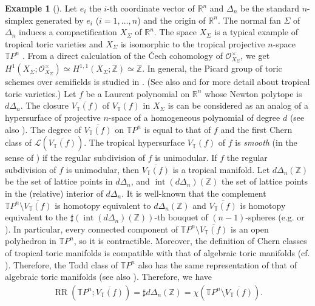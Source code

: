 \documentclass[a4paper,dvipdfmx,reqno,12pt]{amsart}
\theoremstyle{definition}
\newtheorem{example}[theorem]{Example}
\newcommand{\opn}[1]{\operatorname{#1}}
\numberwithin{equation}{section}
\begin{document}
\begin{example}[{\cite[Example 2.11]{demedrano2023chern}}]
\label{example-TPn}
Let $e_i$ the $i$-th coordinate vector of $\mathbb{R}^n$
and $\Delta_{n}$ be the standard $n$-simplex generated by
$e_i$ ($i=1,\ldots,n$) and the origin of $\mathbb{R}^n$.
The normal fan $\Sigma$ of $\Delta_{n}$ induces 
a compactification $X_{\Sigma}$ of $\mathbb{R}^n$.
The space $X_{\Sigma}$ is a typical example of
tropical toric varieties \cite{MR2428356,MR2511632}
and $X_{\Sigma}$ is
isomorphic to the tropical projective
$n$-space $\mathbb{T}P^{n}$ \cite[Example 3.10]{MR2275625}.
From a direct calculation of the \v{C}ech cohomology of
$\mathcal{O}_{X_{\Sigma}}^{\times}$, we get 
$H^{1}(X_{\Sigma};\mathcal{O}_{X_{\Sigma}}^{\times})
\simeq H^{1,1}(X_{\Sigma};\mathbb{Z})\simeq \mathbb{Z}$.
In general, the Picard group of toric 
schemes over semifields is studied in \cite{MR4016643}. 
(See also \cite{Meyer2011} and
\cite[Chapter 3]{mikhalkin2018tropical} for more detail
about tropical toric varieties.)
Let $f$ be a Laurent polynomial on $\mathbb{R}^{n}$
whose Newton polytope is $d\Delta_{n}$.
The closure $\overline{V_{\mathbb{T}}(f)}$ of 
$V_{\mathbb{T}}(f)$ in $X_{\Sigma}$
is can be considered
as an analog of a hypersurface of projective $n$-space of
a homogeneous polynomial of degree $d$
(see also \cite[Definition 3.4.6]{mikhalkin2018tropical}).
The degree of $\overline{V_{\mathbb{T}}(f)}$
on $\mathbb{T}P^n$ is equal to 
that of $f$ and the first Chern class 
of $\mathcal{L}(\overline{V_{\mathbb{T}}(f)})$.
The tropical hypersurface $V_{\mathbb{T}}(f)$ of $f$
is \emph{smooth} (in the sense of
\cite[]{MR3287221})
if the regular subdivision of $f$ is unimodular.
If $f$ the regular subdivision of $f$ is unimodular,
then $\overline{V_{\mathbb{T}}(f)}$ is a tropical manifold.
Let $d\Delta_n(\mathbb{Z})$ be the set of lattice points
in $d\Delta_n$, and 
$\opn{int}(d\Delta_n)(\mathbb{Z})$ the set of lattice points
in the (relative) interior of $d\Delta_n$.
It is well-known that the complement 
$\mathbb{T}P^{n}\setminus
\overline{V_{\mathbb{T}}(f)}$ is homotopy equivalent
to $d\Delta_n(\mathbb{Z})$ and 
$\overline{V_{\mathbb{T}}(f)}$ is homotopy equivalent
to the $\sharp (\opn{int}(d\Delta_n)(\mathbb{Z}))$-th
bouquet of $(n-1)$-spheres
(e.g. \cite[Proposition 3.1.6]{MR3287221}
or \cite[Proposition 3.4.12]{mikhalkin2018tropical}).
In particular, every connected component
of $\mathbb{T}P^{n}\setminus
\overline{V_{\mathbb{T}}(f)}$ is an open polyhedron in 
$\mathbb{T}P^{n}$, so it is contractible.
Moreover, the definition of Chern classes of
tropical toric manifolds \cite{demedrano2023chern}
is compatible with
that of algebraic toric manifolds
(cf. \cite[Proposition 13.1.2]{MR2810322}).
Therefore, the Todd class of $\mathbb{T}P^{n}$
also has the same representation of that of
algebraic toric manifolds
(see also \cite[Theorem 13.1.6]{MR2810322}). 
Therefore, we have
\begin{align}
\opn{RR}(\mathbb{T}P^{n};\overline{V_{\mathbb{T}}(f)})=
\sharp d\Delta_n(\mathbb{Z})=
\chi(\mathbb{T}P^{n}\setminus
\overline{V_{\mathbb{T}}(f)}).
\end{align}


\end{example}
\end{document}
